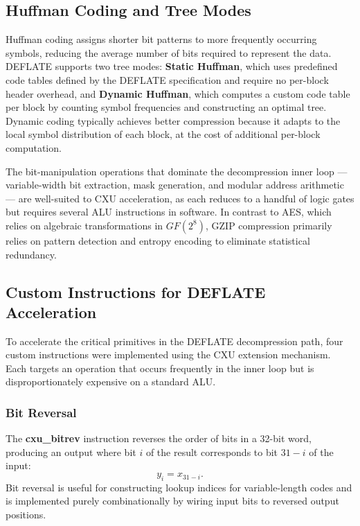 \subsection{Huffman Coding and Tree Modes}
\label{subsec:huffman}

Huffman coding assigns shorter bit patterns to more frequently occurring symbols,
reducing the average number of bits required to represent the data.
DEFLATE supports two tree modes: \textbf{Static Huffman}, which uses predefined code
tables defined by the DEFLATE specification and require no per-block header overhead,
and \textbf{Dynamic Huffman}, which computes a custom code table per block by counting
symbol frequencies and constructing an optimal tree.
Dynamic coding typically achieves better compression because it adapts to the local
symbol distribution of each block, at the cost of additional per-block computation.

The bit-manipulation operations that dominate the decompression inner loop ---
variable-width bit extraction, mask generation, and modular address arithmetic ---
are well-suited to CXU acceleration, as each reduces to a handful of logic gates but
requires several ALU instructions in software.
In contrast to AES, which relies on algebraic transformations in $GF(2^8)$, GZIP
compression primarily relies on pattern detection and entropy encoding to eliminate
statistical redundancy.

\subsection{Custom Instructions for DEFLATE Acceleration}
\label{subsec:deflate_cxu}

To accelerate the critical primitives in the DEFLATE decompression path, four custom
instructions were implemented using the CXU extension mechanism.
Each targets an operation that occurs frequently in the inner loop but is
disproportionately expensive on a standard ALU.

\subsubsection{Bit Reversal}

The \textbf{cxu\_bitrev} instruction reverses the order of bits in a 32-bit word,
producing an output where bit $i$ of the result corresponds to bit $31-i$ of the input:
$$
y_i = x_{31-i}.
$$
Bit reversal is useful for constructing lookup indices for variable-length codes and is
implemented purely combinationally by wiring input bits to reversed output positions.

